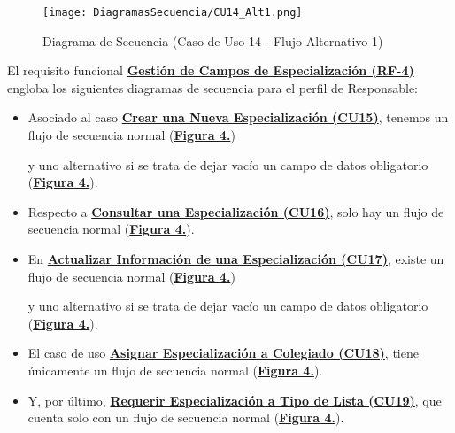 \begin{landscape}
  \label{fig:Secuencia_CU14_Alt1}
  \vspace*{\fill}
  \begin{figure}[!htbp]
    \centering
    \texttt{[image: DiagramasSecuencia/CU14\_Alt1.png]}
    \caption{Diagrama de Secuencia (Caso de Uso 14 - Flujo Alternativo 1)}
  \end{figure}
  \vfill
\end{landscape}
\FloatBarrier


El requisito funcional \textbf{\hyperref[tab:rfGestEspec]{Gestión de Campos de Especialización (RF-4)}} engloba los siguientes diagramas de secuencia para el perfil de Responsable:
\begin{itemize}
  \item \addtocounter{figura_cap4}{1} Asociado al caso \textbf{\hyperref[tab:curCrearEspec]{Crear una Nueva Especialización (CU15)}}, tenemos un flujo de secuencia normal (\textbf{\hyperref[fig:Secuencia_CU15_Normal]{Figura 4.}}) \addtocounter{figura_cap4}{1} y uno alternativo si se trata de dejar vacío un campo de datos obligatorio (\textbf{\hyperref[fig:Secuencia_CU15_Alt1]{Figura 4.}}).
  \item \addtocounter{figura_cap4}{1} Respecto a \textbf{\hyperref[tab:curConsultarEspec]{Consultar una Especialización (CU16)}}, solo hay un flujo de secuencia normal (\textbf{\hyperref[fig:Secuencia_CU16_Normal]{Figura 4.}}).
  \item \addtocounter{figura_cap4}{1} En \textbf{\hyperref[tab:curActualizarEspec]{Actualizar Información de una Especialización (CU17)}}, existe un flujo de secuencia normal (\textbf{\hyperref[fig:Secuencia_CU17_Normal]{Figura 4.}}) \addtocounter{figura_cap4}{1} y uno alternativo si se trata de dejar vacío un campo de datos obligatorio (\textbf{\hyperref[fig:Secuencia_CU17_Alt1]{Figura 4.}}).
  \item \addtocounter{figura_cap4}{1} El caso de uso \textbf{\hyperref[tab:curAsignarEspecColeg]{Asignar Especialización a Colegiado (CU18)}}, tiene únicamente un flujo de secuencia normal (\textbf{\hyperref[fig:Secuencia_CU18_Normal]{Figura 4.}}).
  \item \addtocounter{figura_cap4}{1} Y, por último, \textbf{\hyperref[tab:curRequerirEspecTipoLst]{Requerir Especialización a Tipo de Lista (CU19)}}, que cuenta solo con un flujo de secuencia normal (\textbf{\hyperref[fig:Secuencia_CU19_Normal]{Figura 4.}}).
\end{itemize}


